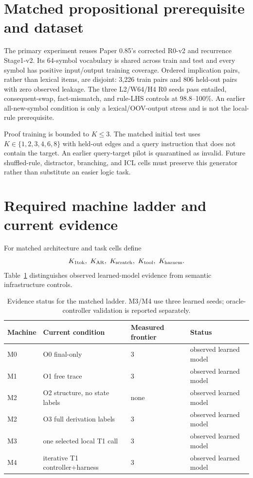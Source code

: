 \documentclass[10pt]{article}
\begin{document}
\section{Matched propositional prerequisite and dataset}
The primary experiment reuses Paper 0.85's corrected R0-v2 and recurrence Stage1-v2. Its 64-symbol vocabulary is shared across train and test and every symbol has positive input/output training coverage. Ordered implication pairs, rather than lexical items, are disjoint: 3,226 train pairs and 806 held-out pairs with zero observed leakage. The three L2/W64/H4 R0 seeds pass entailed, consequent-swap, fact-mismatch, and rule-LHS controls at 98.8--100\%. An earlier all-new-symbol condition is only a lexical/OOV-output stress and is not the local-rule prerequisite.

Proof training is bounded to $K\le3$. The matched initial test uses $K\in\{1,2,3,4,6,8\}$ with held-out edges and a query instruction that does not contain the target. An earlier query-target pilot is quarantined as invalid. Future shuffled-rule, distractor, branching, and ICL cells must preserve this generator rather than substitute an easier logic task.

\section{Required machine ladder and current evidence}
For matched architecture and task cells define
\[
K_{1\rm tok},\ K_{\rm AR},\ K_{\rm scratch},\ K_{\rm tool},\ K_{\rm harness}.
\]
Table~\ref{tab:status} distinguishes observed learned-model evidence from semantic infrastructure controls.

\begin{table}[H]\centering\small
\begin{tabular}{llll}
\toprule
Machine & Current condition & Measured frontier & Status\\\midrule
M0 & O0 final-only & 3 & observed learned model\\
M1 & O1 free trace & 3 & observed learned model\\
M2 & O2 structure, no state labels & none & observed learned model\\
M2 & O3 full derivation labels & 3 & observed learned model\\
M3 & one selected local T1 call & 3 & observed learned model\\
M4 & iterative T1 controller+harness & 3 & observed learned model\\
\bottomrule
\end{tabular}
\caption{Evidence status for the matched ladder. M3/M4 use three learned seeds; oracle-controller validation is reported separately.}\label{tab:status}
\end{table}
\end{document}
